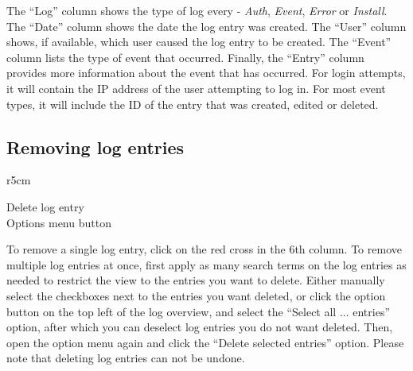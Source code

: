\documentclass[a4paper,oneside,openany,12pt]{memoir}
\begin{document}
The ``Log'' column shows the type of log every - \emph{Auth}, \emph{Event}, \emph{Error} or \emph{Install}.
The ``Date'' column shows the date the log entry was created.
The ``User'' column shows, if available, which user caused the log entry to be created.
The ``Event'' column lists the type of event that occurred.
Finally, the ``Entry'' column provides more information about the event that has occurred.
For login attempts, it will contain the IP address of the user attempting to log in.
For most event types, it will include the ID of the entry that was created, edited or deleted.



\subsection{Removing log entries}
\begin{wrapfigure}[4]{r}{5cm} %
  \vspace{-25pt}
  \begin{framed}
     Delete log entry\\
     Options menu button
  \end{framed}
\end{wrapfigure}
To remove a single log entry, click on the red cross in the 6th column.
To remove multiple log entries at once, first apply as many search terms on the log entries as needed to restrict the view to the entries you want to delete.
Either manually select the checkboxes next to the entries you want deleted,
 or click the option button on the top left of the log overview, and select the ``Select all ... entries'' option,
 after which you can deselect log entries you do not want deleted.
Then, open the option menu again and click the ``Delete selected entries'' option.
Please note that deleting log entries can not be undone.





\pagebreak[4] %
\end{document}
